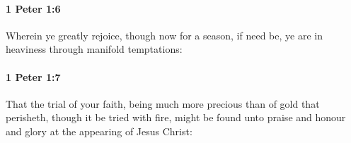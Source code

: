 		\paragraph{1 Peter 1:6} %
			\label{1PETER-1-6}

			Wherein ye greatly rejoice, though now for a season, if need be, ye are in heaviness through manifold temptations:

			\begin{framed}
			\scriptsize
				\begin{compactdesc}
					\item[SBLG] 
				\end{compactdesc}
			\end{framed}

		\paragraph{1 Peter 1:7} %
			\label{1PETER-1-7}

			That the trial of your faith, being much more precious than of gold that perisheth, though it be tried with fire, might be found unto praise and honour and glory at the appearing of Jesus Christ:

